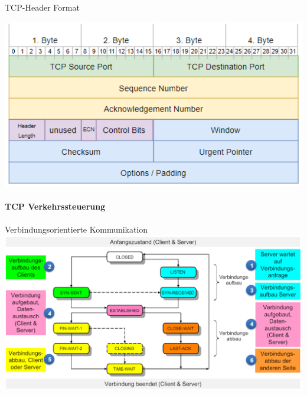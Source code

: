\begin{concept}{TCP-Header Format}
\begin{itemize}
    \end{itemize}
    \includegraphics[width=0.9\linewidth]{images/tcpheader.png}
\end{concept}

\paragraph{TCP Verkehrssteuerung}

\begin{concept}{Verbindungsorientierte Kommunikation}\\
    \includegraphics[width=1\linewidth]{images/zustandsdiagramm_tcp.png}
\end{concept}

